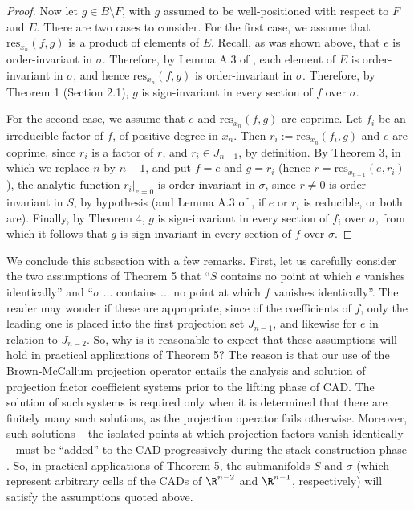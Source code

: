 \documentclass{article}
\begin{document}
\begin{proof}
    Now let $g \in B \setminus F$, with $g$ 
    assumed to be well-positioned with respect to $F$ and $E$. 
    There are two cases to consider.
    For the first case, we assume that $\mathrm{res}_{x_n}(f,g)$
    is a product of elements of $E$.
    Recall, as was shown above, that $e$ is order-invariant in $\sigma$.
    Therefore, by Lemma A.3 of \cite{McCallum1988},
    each element of $E$ is order-invariant in $\sigma$,
    and hence $\mathrm{res}_{x_n}(f,g)$ is order-invariant in $\sigma$.
    Therefore, by Theorem 1 (Section 2.1),
    $g$ is sign-invariant in every section of $f$ over $\sigma$.
    
    For the second case, we assume that $e$ and $\mathrm{res}_{x_n}(f,g)$
    are coprime.
    Let $f_i$ be an irreducible factor of $f$, of positive degree
    in $x_n$. Then $r_i := \mathrm{res}_{x_n}(f_i,g)$ and $e$ are coprime,
    since $r_i$ is a factor of $r$,
    and $r_i \in J_{n-1}$, by definition.
    By Theorem 3, in which we replace $n$ by $n-1$,
    and put $f = e$ and $g = r_i$ 
    (hence $r = \mathrm{res}_{x_{n-1}}(e,r_i)$),
    the analytic function $r_i|_{e=0}$ is order invariant in $\sigma$,
    since $r \neq 0$ is order-invariant in $S$, by hypothesis
    (and Lemma A.3 of \cite{McCallum1988}, if $e$ or $r_i$
    is reducible, or both are).
    Finally, by Theorem 4, $g$ is sign-invariant in every section
    of $f_i$ over $\sigma$, from which it follows that 
    $g$ is sign-invariant in every section of $f$ over $\sigma$.
\end{proof}

    We conclude this subsection with a few remarks. First, let us
    carefully consider the two assumptions of Theorem 5 that 
    ``$S$ contains no point at which $e$ vanishes identically'' and
    ``$\sigma$ ... contains ... no point at which 
    $f$ vanishes identically''. The reader may wonder
    if these are appropriate, since of the coefficients of
    $f$, only the leading one is placed into the first projection set 
    $J_{n-1}$, and likewise for $e$ in relation to $J_{n-2}$. 
    So, why is it reasonable to expect
    that these assumptions will hold in practical applications of
    Theorem 5? The reason is that our use of the Brown-McCallum
    projection operator entails the analysis and solution 
    of projection factor coefficient systems prior to the lifting phase
    of CAD. The solution of such systems is required only when it is
    determined that there are finitely many such solutions,
    as the projection operator fails otherwise.
    Moreover, such solutions -- the isolated points at which projection
    factors vanish identically -- must be ``added'' to the CAD
    progressively during the stack construction phase \cite{Brown2001}.
    So, in practical applications of Theorem 5, the submanifolds
    $S$ and $\sigma$ (which represent arbitrary cells of the CADs
    of $\R^{n-2}$ and $\R^{n-1}$, respectively) will satisfy
    the assumptions quoted above.
\end{document}
